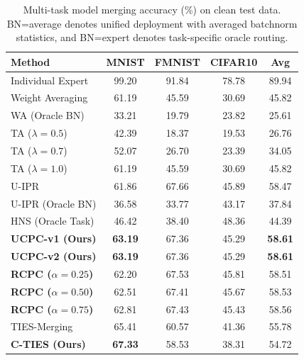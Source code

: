 \documentclass{article}
\theoremstyle{plain}
\theoremstyle{definition}
\theoremstyle{remark}
\begin{document}
\begin{table}[t]
  \vspace{-5pt}
  \begin{minipage}{0.54\textwidth}
    \centering
    \caption{Multi-task model merging accuracy (\%) on clean test data. BN=average denotes unified deployment with averaged batchnorm statistics, and BN=expert denotes task-specific oracle routing.}
    \label{tab:clean_results}
    \vskip 0.03in
    \begin{small}
      \begin{sc}
        \setlength{\tabcolsep}{1.5pt}
        \begin{tabular}{lcccc}
          \toprule
          Method & MNIST & FMNIST & CIFAR10 & Avg \\
          \midrule
          Individual Expert & 99.20 & 91.84 & 78.78 & 89.94 \\
          \midrule
          Weight Averaging & 61.19 & 45.59 & 30.69 & 45.82 \\
          WA (Oracle BN) & 33.21 & 19.79 & 23.82 & 25.61 \\
          TA ($\lambda=0.5$) & 42.39 & 18.37 & 19.53 & 26.76 \\
          TA ($\lambda=0.7$) & 52.07 & 26.70 & 23.39 & 34.05 \\
          TA ($\lambda=1.0$) & 61.19 & 45.59 & 30.69 & 45.82 \\
          \midrule
          U-IPR & 61.86 & 67.66 & 45.89 & 58.47 \\
          U-IPR (Oracle BN) & 36.58 & 33.77 & 43.17 & 37.84 \\
          \midrule
          HNS (Oracle Task) & 46.42 & 38.40 & 48.36 & 44.39 \\
          \midrule
          \textbf{UCPC-v1 (Ours)} & \textbf{63.19} & 67.36 & 45.29 & \textbf{58.61} \\
          \textbf{UCPC-v2 (Ours)} & \textbf{63.19} & 67.36 & 45.29 & \textbf{58.61} \\
          \midrule
          \textbf{RCPC ($\alpha=0.25$)} & 62.20 & 67.53 & 45.81 & 58.51 \\
          \textbf{RCPC ($\alpha=0.50$)} & 62.51 & 67.41 & 45.67 & 58.53 \\
          \textbf{RCPC ($\alpha=0.75$)} & 62.81 & 67.43 & 45.43 & 58.56 \\
          \midrule
          TIES-Merging & 65.41 & 60.57 & 41.36 & 55.78 \\
          \textbf{C-TIES (Ours)} & \textbf{67.33} & 58.53 & 38.31 & 54.72 \\

\end{tabular}
\end{sc}
\end{small}
\end{minipage}
\end{table}
\end{document}
